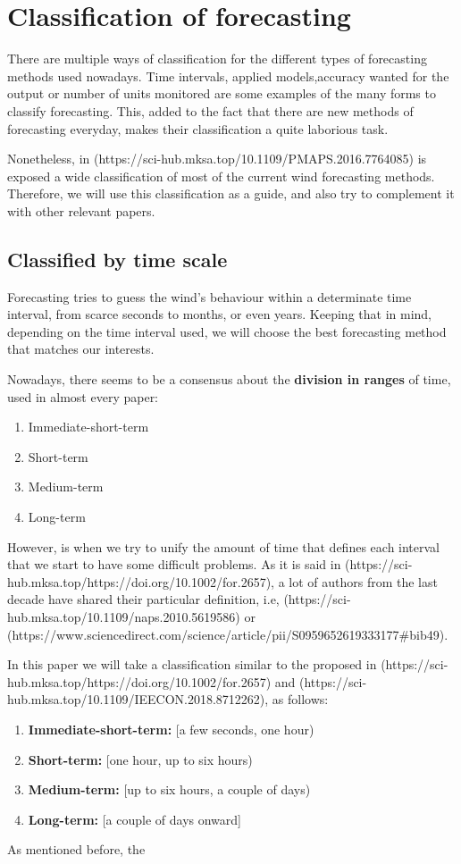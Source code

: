 \section{Classification of forecasting}

There are multiple ways of classification for the different types of forecasting methods used nowadays. Time intervals, applied models,accuracy wanted for the output or number of units monitored are some examples of the many forms to classify forecasting. This, added to the fact that there are new methods of forecasting everyday, makes their classification a quite laborious task.

Nonetheless, in (https://sci-hub.mksa.top/10.1109/PMAPS.2016.7764085) is exposed a wide classification of most of the current wind forecasting methods. Therefore, we will use this classification as a guide, and also try to complement it with other relevant papers.

\subsection{Classified by time scale}

Forecasting tries to guess the wind's behaviour within a determinate time interval, from scarce seconds to months, or even years. Keeping that in mind, depending on the time interval used, we will choose the best forecasting method that matches our interests.

Nowadays, there seems to be a consensus about the \textbf{division in ranges} of time, used in almost every paper:

\begin{enumerate}
    \item Immediate-short-term
    \item Short-term
    \item Medium-term
    \item Long-term
\end{enumerate}

However, is when we try to unify the amount of time that defines each interval that we start to have some difficult problems. As it is said in (https://sci-hub.mksa.top/https://doi.org/10.1002/for.2657), a lot of authors from the last decade have shared their particular definition, i.e, (https://sci-hub.mksa.top/10.1109/naps.2010.5619586) or (https://www.sciencedirect.com/science/article/pii/S0959652619333177\#bib49).

In this paper we will take a classification similar to the proposed in (https://sci-hub.mksa.top/https://doi.org/10.1002/for.2657) and (https://sci-hub.mksa.top/10.1109/IEECON.2018.8712262), as follows:

\begin{enumerate}
    \item \textbf{Immediate-short-term:}  [a few seconds, one hour)
    \item \textbf{Short-term:} [one hour, up to six hours)
    \item \textbf{Medium-term:} [up to six hours, a couple of days)
    \item \textbf{Long-term:} [a couple of days onward]
\end{enumerate}

As mentioned before, the 
